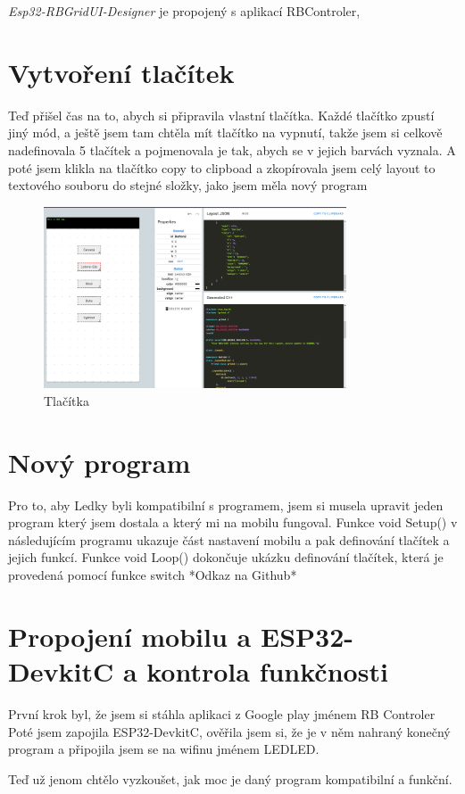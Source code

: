 {\em Esp32-RBGridUI-Designer} je propojený s aplikací RBControler, \cite{RBControler}
\section{Vytvoření tlačítek}
Teď přišel čas na to, abych si připravila vlastní tlačítka. Každé tlačítko zpustí jiný mód, a ještě jsem tam chtěla mít tlačítko na vypnutí, takže jsem si celkově nadefinovala 5 tlačítek a pojmenovala je tak, abych se v jejich barvách vyznala. A poté jsem klikla na tlačítko copy to clipboad a zkopírovala jsem celý layout to textového souboru do stejné složky, jako jsem měla nový program  

\begin{figure}[htbp]
	\centering
	\includegraphics[width=0.8\textwidth]{img/Esp32-RBGridUI-Designer - Tlačítka.png}
	\caption{Tlačítka}
\end{figure}
\section{Nový program} %
Pro to, aby Ledky byli kompatibilní s programem, jsem si musela upravit jeden program který jsem dostala a který mi na mobilu fungoval. %
Funkce void Setup() v následujícím programu ukazuje část nastavení mobilu a pak definování tlačítek a jejich funkcí. Funkce void Loop() dokončuje ukázku definování tlačítek, která je provedená pomocí funkce switch
*Odkaz na Github*





\section{Propojení mobilu a ESP32-DevkitC a kontrola funkčnosti}
První krok byl, že jsem si stáhla aplikaci z Google play jménem RB Controler %
Poté jsem zapojila ESP32-DevkitC, ověřila jsem si, že je v něm nahraný konečný program a připojila jsem se na wifinu jménem LEDLED. 


Teď už jenom chtělo vyzkoušet, jak moc je daný program kompatibilní a funkční. %

\newpage
